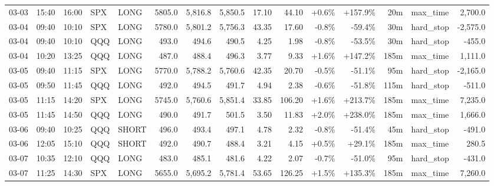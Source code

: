 \documentclass[11pt,a4paper,twoside]{article}
\begin{document}
\begin{landscape}
\begin{center}
\begin{longtable}{>{\color{txtmain}}l l l l l r r r r r r r r >{\color{txtmain}}l r}
03-03 & 15:40 & 16:00 & SPX & LONG & 5805.0 & 5,816.8 & 5,850.5 & 17.10 & 44.10 & \textcolor{wingreen}{+0.6\%} & \textcolor{wingreen}{+157.9\%} & 20m & max\_time & \textcolor{wingreen}{2,700.0} \\
03-04 & 09:40 & 10:10 & SPX & LONG & 5780.0 & 5,801.2 & 5,756.3 & 43.35 & 17.60 & \textcolor{lossred}{-0.8\%} & \textcolor{lossred}{-59.4\%} & 30m & hard\_stop & \textcolor{lossred}{-2,575.0} \\
03-04 & 09:40 & 10:10 & QQQ & LONG & 493.0 & 494.6 & 490.5 & 4.25 & 1.98 & \textcolor{lossred}{-0.8\%} & \textcolor{lossred}{-53.5\%} & 30m & hard\_stop & \textcolor{lossred}{-455.0} \\
03-04 & 10:20 & 13:25 & QQQ & LONG & 487.0 & 488.4 & 496.3 & 3.77 & 9.33 & \textcolor{wingreen}{+1.6\%} & \textcolor{wingreen}{+147.2\%} & 185m & max\_time & \textcolor{wingreen}{1,111.0} \\
03-05 & 09:40 & 11:15 & SPX & LONG & 5770.0 & 5,788.2 & 5,760.6 & 42.35 & 20.70 & \textcolor{lossred}{-0.5\%} & \textcolor{lossred}{-51.1\%} & 95m & hard\_stop & \textcolor{lossred}{-2,165.0} \\
03-05 & 09:50 & 11:45 & QQQ & LONG & 492.0 & 494.5 & 491.7 & 4.94 & 2.38 & \textcolor{lossred}{-0.6\%} & \textcolor{lossred}{-51.8\%} & 115m & hard\_stop & \textcolor{lossred}{-511.0} \\
03-05 & 11:15 & 14:20 & SPX & LONG & 5745.0 & 5,760.6 & 5,851.4 & 33.85 & 106.20 & \textcolor{wingreen}{+1.6\%} & \textcolor{wingreen}{+213.7\%} & 185m & max\_time & \textcolor{wingreen}{7,235.0} \\
03-05 & 11:45 & 14:50 & QQQ & LONG & 490.0 & 491.7 & 501.5 & 3.50 & 11.83 & \textcolor{wingreen}{+2.0\%} & \textcolor{wingreen}{+238.0\%} & 185m & max\_time & \textcolor{wingreen}{1,666.0} \\
03-06 & 09:40 & 10:25 & QQQ & SHORT & 496.0 & 493.4 & 497.1 & 4.78 & 2.32 & \textcolor{lossred}{-0.8\%} & \textcolor{lossred}{-51.4\%} & 45m & hard\_stop & \textcolor{lossred}{-491.0} \\
03-06 & 12:05 & 15:10 & QQQ & SHORT & 492.0 & 490.7 & 488.4 & 3.21 & 4.15 & \textcolor{wingreen}{+0.5\%} & \textcolor{wingreen}{+29.1\%} & 185m & max\_time & \textcolor{wingreen}{280.5} \\
03-07 & 10:35 & 12:10 & QQQ & LONG & 483.0 & 485.1 & 481.6 & 4.22 & 2.07 & \textcolor{lossred}{-0.7\%} & \textcolor{lossred}{-51.0\%} & 95m & hard\_stop & \textcolor{lossred}{-431.0} \\
03-07 & 11:25 & 14:30 & SPX & LONG & 5655.0 & 5,695.2 & 5,781.4 & 53.65 & 126.25 & \textcolor{wingreen}{+1.5\%} & \textcolor{wingreen}{+135.3\%} & 185m & max\_time & \textcolor{wingreen}{7,260.0} \\

\end{longtable}
\end{center}
\end{landscape}
\end{document}
